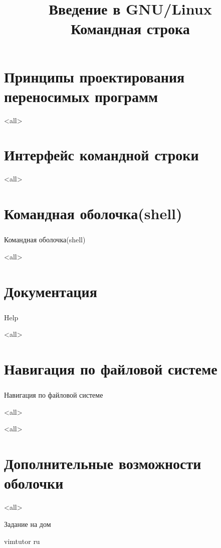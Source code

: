 
\title{Введение в GNU/Linux\\Командная строка}


\begin{frame}
 \frametitle{}
 \titlepage
\end{frame}

\section{Принципы проектирования переносимых программ}
\mode<all>{}

\section{Интерфейс командной строки}
\mode<all>{}

\section{ Командная оболочка(shell) }
\begin{frame}
\frametitle{}
 \begin{center}
   {\Large Командная оболочка(shell) }
 \end{center}
\end{frame}

\mode<all>{}

\section{ Документация }
\begin{frame}
\frametitle{}
 \begin{center}
   {\Large Help }
 \end{center}
\end{frame}
\mode<all>{}

\section{ Навигация по файловой системе}
\begin{frame}
\frametitle{}
 \begin{center}
   {\Large Навигация по файловой системе }
 \end{center}
\end{frame}
\mode<all>{}

\mode<all>{}


\section{ Дополнительные возможности оболочки}
\mode<all>{}


\begin{frame}{Задание на дом}
\begin{block}{}
vimtutor ru
\end{block}
\end{frame}



